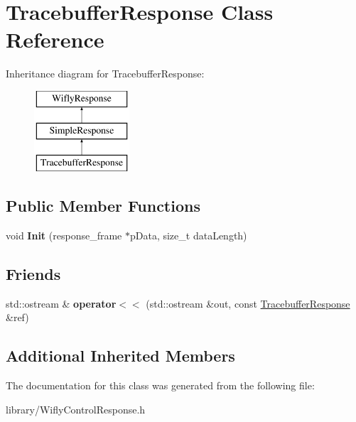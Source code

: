 \hypertarget{class_tracebuffer_response}{\section{Tracebuffer\-Response Class Reference}
\label{class_tracebuffer_response}
}
Inheritance diagram for Tracebuffer\-Response\-:\begin{figure}[H]
\begin{center}
\leavevmode
\includegraphics[height=3.000000cm]{class_tracebuffer_response}
\end{center}
\end{figure}
\subsection*{Public Member Functions}
\begin{DoxyCompactItemize}
\item 
\hypertarget{class_tracebuffer_response_aa091cf2da2f93d5be25386c91b827d72}{void {\bfseries Init} (response\-\_\-frame $\ast$p\-Data, size\-\_\-t data\-Length)}\label{class_tracebuffer_response_aa091cf2da2f93d5be25386c91b827d72}

\end{DoxyCompactItemize}
\subsection*{Friends}
\begin{DoxyCompactItemize}
\item 
\hypertarget{class_tracebuffer_response_a4ada06f1b6fe35635b6efdbbea164fd8}{std\-::ostream \& {\bfseries operator$<$$<$} (std\-::ostream \&out, const \hyperlink{class_tracebuffer_response}{Tracebuffer\-Response} \&ref)}\label{class_tracebuffer_response_a4ada06f1b6fe35635b6efdbbea164fd8}

\end{DoxyCompactItemize}
\subsection*{Additional Inherited Members}


The documentation for this class was generated from the following file\-:\begin{DoxyCompactItemize}
\item 
library/Wifly\-Control\-Response.\-h\end{DoxyCompactItemize}
